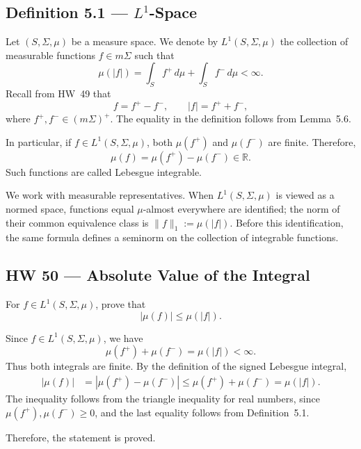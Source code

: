 \subsection*{Definition 5.1 --- $L^1$-Space}%
%

Let $(S,\Sigma,\mu)$ be a measure space. We denote by $L^1(S,\Sigma,\mu)$ the collection of measurable functions $f\in m\Sigma$ such that
\[
\mu(|f|)=\int_S f^+\,d\mu+\int_S f^-\,d\mu<\infty.
\]
Recall from HW~49 that
\[
f=f^+-f^-,\qquad |f|=f^++f^-,
\]
where $f^+,f^-\in(m\Sigma)^+$. The equality in the definition follows from Lemma~5.6.

In particular, if $f\in L^1(S,\Sigma,\mu)$, both $\mu(f^+)$ and $\mu(f^-)$ are finite. Therefore,
\[
\mu(f)=\mu(f^+)-\mu(f^-)\in\mathbb R.
\]
Such functions are called Lebesgue integrable.

We work with measurable representatives. When $L^1(S,\Sigma,\mu)$ is viewed as a normed space, functions equal $\mu$-almost everywhere are identified; the norm of their common equivalence class is $\|f\|_1:=\mu(|f|)$. Before this identification, the same formula defines a seminorm on the collection of integrable functions.

\subsection*{HW 50 --- Absolute Value of the Integral}%
%

 For $f\in L^1(S,\Sigma,\mu)$, prove that
\[
|\mu(f)|\le\mu(|f|).
\]
\par\noindent{}\par\nobreak

Since $f\in L^1(S,\Sigma,\mu)$, we have
\[
\mu(f^+)+\mu(f^-)=\mu(|f|)<\infty.
\]
Thus both integrals are finite. By the definition of the signed Lebesgue integral,
\[
\begin{aligned}
|\mu(f)|&=|\mu(f^+)-\mu(f^-)| \le\mu(f^+)+\mu(f^-) =\mu(|f|).
\end{aligned}
\]
The inequality follows from the triangle inequality for real numbers, since $\mu(f^+),\mu(f^-)\ge0$, and the last equality follows from Definition~5.1.

Therefore, the statement is proved. 

